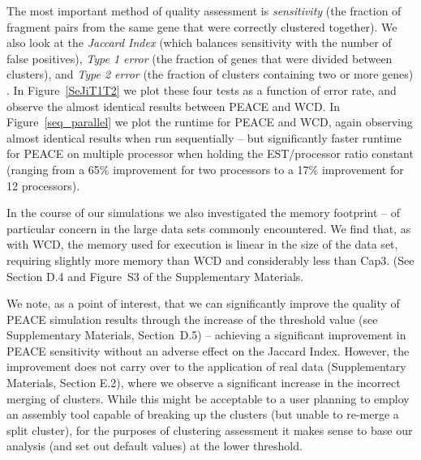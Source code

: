 \documentclass[a4,center,fleqn]{NAR}
\newcommand{\mc}[1]{#1}
\newcommand{\peace} {{\small PEACE}}
\newcommand{\wcd} {{\small WCD}}
\newcommand{\capthree} {{\small Cap3}}
\begin{document}
\mc{The most important method of quality assessment is {\it
    sensitivity} (the fraction of fragment pairs from the same gene
  that were} \mc{correctly clustered together).  We also look at the
  {\it Jaccard Index} (which balances sensitivity with the number of
  false positives), {\it Type 1 error} (the fraction of genes that
  were divided between clusters), and {\it Type 2 error} (the fraction
  of clusters containing two or more genes)
  \cite{Hazelhurst08a,Wang04}.  In Figure~\ref{SeJiT1T2} we plot these
  four tests as a function of error rate, and observe the almost
  identical results between \peace\/ and \wcd\/.  In
  Figure~\ref{seq_parallel} we plot the runtime for \peace\/ and
  \wcd\/, again observing almost identical results when run
  sequentially -- but significantly faster runtime for PEACE on
  multiple processor when holding the EST/processor ratio constant
  (ranging from a 65\% improvement for two processors to a 17\%
  improvement for 12 processors).}

\mc{In the course of our simulations we also investigated the memory
  footprint -- of particular concern in the large data sets commonly
  encountered.  We find that, as with \wcd, the memory used for
  execution is linear in the size of the data set, requiring
  slightly more memory than \wcd\/ and considerably less than
  \capthree.  (See Section D.4 and Figure~S3 of the Supplementary
  Materials.}

\mc{We note, as a point of interest, that we can significantly improve
  the quality of \peace\/} \mc{simulation} \mc{results} \mc{through} \mc{the} \mc{increase} \mc{of}
  \mc{the} \mc{threshold} \mc{value} \mc{(see} \mc{Supplementary} \mc{Materials,} \mc{Section~D.5) --}
  \mc{achieving} \mc{a} \mc{significant} \mc{improvement} \mc{in PEACE sensitivity without an
  adverse effect on the Jaccard Index.  However, the improvement does
  not carry over to the application of real data (Supplementary
  Materials, Section E.2), where we observe a significant increase in
  the incorrect merging of clusters.  While this might be acceptable
  to a user planning to employ an assembly tool capable of breaking
  up the clusters (but unable to re-merge a split cluster), for the
  purposes of clustering assessment it makes sense to base our analysis (and
  set out default values) at the lower threshold.}
\end{document}
